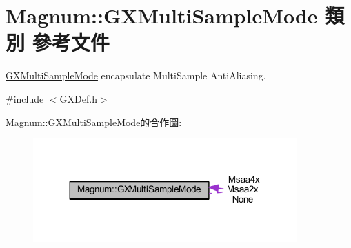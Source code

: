 \hypertarget{class_magnum_1_1_g_x_multi_sample_mode}{}\section{Magnum\+:\+:G\+X\+Multi\+Sample\+Mode 類別 參考文件}
\label{class_magnum_1_1_g_x_multi_sample_mode}


\hyperlink{class_magnum_1_1_g_x_multi_sample_mode}{G\+X\+Multi\+Sample\+Mode} encapsulate Multi\+Sample Anti\+Aliasing.  




{\ttfamily \#include $<$G\+X\+Def.\+h$>$}



Magnum\+:\+:G\+X\+Multi\+Sample\+Mode的合作圖\+:\nopagebreak
\begin{figure}[H]
\begin{center}
\leavevmode
\includegraphics[width=287pt]{class_magnum_1_1_g_x_multi_sample_mode__coll__graph}
\end{center}
\end{figure}
